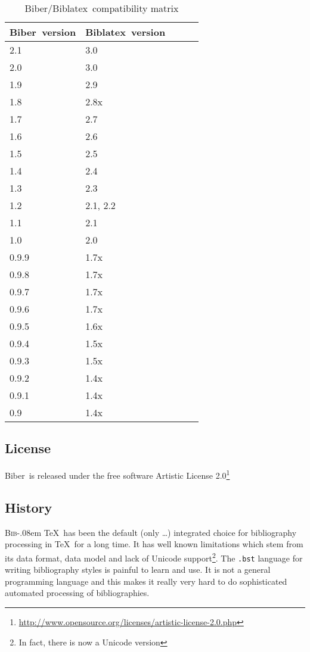 \documentclass{ltxdockit}
\def\BibTeX{\textsc{Bib}\kern-.08em \TeX}
\newcommand*{\biber}{Biber\xspace}
\newcommand*{\biblatex}{Biblatex\xspace}
\begin{document}
\begin{table}
\begin{center}
\small
\begin{tabular}{lllll}
\toprule
\biber\ version & \biblatex\ version\\
\midrule
2.1 & 3.0\\
2.0 & 3.0\\
1.9 & 2.9\\
1.8 & 2.8x\\
1.7 & 2.7\\
1.6 & 2.6\\
1.5 & 2.5\\
1.4 & 2.4\\
1.3 & 2.3\\
1.2 & 2.1, 2.2\\
1.1 & 2.1\\
1.0 & 2.0\\
0.9.9 & 1.7x\\
0.9.8 & 1.7x\\
0.9.7 & 1.7x\\
0.9.6 & 1.7x\\
0.9.5 & 1.6x\\
0.9.4 & 1.5x\\
0.9.3 & 1.5x\\
0.9.2 & 1.4x\\
0.9.1 & 1.4x\\
0.9 & 1.4x\\
\bottomrule
\end{tabular}
\end{center}
\caption{\biber/\biblatex\ compatibility matrix}
\label{tab:compat}
\end{table}

\subsection{License}

\biber\ is released under the free software Artistic License 2.0\footnote{\url{http://www.opensource.org/licenses/artistic-license-2.0.php}}

\subsection{History}

\BibTeX\ has been the default (only \ldots) integrated choice for
bibliography processing in \TeX\ for a long time. It has well known
limitations which stem from its data format, data model and lack of Unicode
support\footnote{In fact, there is now a Unicode version}. The
\verb+.bst+ language for writing bibliography styles is painful to learn
and use. It is not a general programming language and this makes it really
very hard to do sophisticated automated processing of bibliographies.
\end{document}
